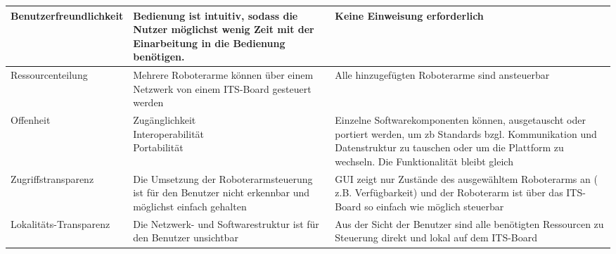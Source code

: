 \begin{longtable}{|>{\raggedright\arraybackslash}p{4cm}|>{\raggedright\arraybackslash}p{5cm}|>{\raggedright\arraybackslash}p{5cm}|}
	Benutzerfreundlichkeit & Bedienung ist intuitiv, sodass die Nutzer möglichst wenig Zeit mit der Einarbeitung in die Bedienung benötigen. 
	& Keine Einweisung erforderlich
	\\
	\hline
	Ressourcenteilung  & Mehrere Roboterarme können über einem Netzwerk von einem ITS-Board gesteuert werden& Alle hinzugefügten Roboterarme sind ansteuerbar \\
	\hline
	Offenheit & 
	\parbox[t]{5cm}{Zugänglichkeit\\Interoperabilität\\Portabilität} 
	& Einzelne Softwarekomponenten können, ausgetauscht oder portiert werden, um zb Standards bzgl. Kommunikation und Datenstruktur zu tauschen oder um die Plattform zu wechseln. Die Funktionalität bleibt gleich\\
	\hline
	Zugriffstransparenz   & Die Umsetzung der Roboterarmsteuerung ist für den Benutzer nicht erkennbar und möglichst einfach gehalten & GUI zeigt nur Zustände des ausgewähltem Roboterarms an ( z.B. Verfügbarkeit) und der Roboterarm ist über das ITS-Board so einfach wie möglich steuerbar\\
	\hline
	Lokalitäts-Transparenz  & Die Netzwerk- und Softwarestruktur ist für den Benutzer unsichtbar  & Aus der Sicht der Benutzer sind alle benötigten Ressourcen zu Steuerung direkt und lokal auf dem ITS-Board\\
	
	
\end{longtable}
\clearpage
